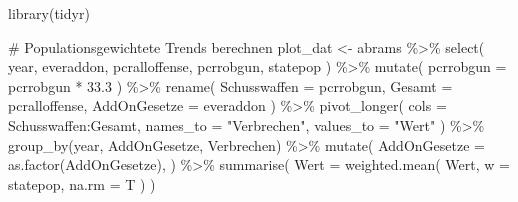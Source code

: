 \documentclass[
  a4paper,
  DIV=11,
  oneside]{scrreprt}
\newenvironment{Shaded}{\begin{snugshade}}{\end{snugshade}}
\newcommand{\AttributeTok}[1]{\textcolor[rgb]{0.40,0.45,0.13}{#1}}
\newcommand{\CommentTok}[1]{\textcolor[rgb]{0.37,0.37,0.37}{#1}}
\newcommand{\FloatTok}[1]{\textcolor[rgb]{0.68,0.00,0.00}{#1}}
\newcommand{\FunctionTok}[1]{\textcolor[rgb]{0.28,0.35,0.67}{#1}}
\newcommand{\NormalTok}[1]{\textcolor[rgb]{0.00,0.23,0.31}{#1}}
\newcommand{\OtherTok}[1]{\textcolor[rgb]{0.00,0.23,0.31}{#1}}
\newcommand{\SpecialCharTok}[1]{\textcolor[rgb]{0.37,0.37,0.37}{#1}}
\newcommand{\StringTok}[1]{\textcolor[rgb]{0.13,0.47,0.30}{#1}}
\begin{document}
\begin{Shaded}
\begin{Highlighting}[]
\FunctionTok{library}\NormalTok{(tidyr)}

\CommentTok{\# Populationsgewichtete Trends berechnen}
\NormalTok{plot\_dat }\OtherTok{\textless{}{-}}\NormalTok{ abrams }\SpecialCharTok{\%\textgreater{}\%} 
  \FunctionTok{select}\NormalTok{(}
\NormalTok{    year, }
\NormalTok{    everaddon, }
\NormalTok{    pcralloffense, }
\NormalTok{    pcrrobgun, }
\NormalTok{    statepop}
\NormalTok{  ) }\SpecialCharTok{\%\textgreater{}\%}
  \FunctionTok{mutate}\NormalTok{(}
    \AttributeTok{pcrrobgun =}\NormalTok{ pcrrobgun }\SpecialCharTok{*} \FloatTok{33.3}
\NormalTok{  ) }\SpecialCharTok{\%\textgreater{}\%}
  \FunctionTok{rename}\NormalTok{(}
    \AttributeTok{Schusswaffen =}\NormalTok{ pcrrobgun, }
    \AttributeTok{Gesamt =}\NormalTok{ pcralloffense,}
    \AttributeTok{AddOnGesetze =}\NormalTok{ everaddon}
\NormalTok{  ) }\SpecialCharTok{\%\textgreater{}\%}
  \FunctionTok{pivot\_longer}\NormalTok{(}
    \AttributeTok{cols =}\NormalTok{ Schusswaffen}\SpecialCharTok{:}\NormalTok{Gesamt, }
    \AttributeTok{names\_to =} \StringTok{"Verbrechen"}\NormalTok{, }
    \AttributeTok{values\_to =} \StringTok{"Wert"}
\NormalTok{  ) }\SpecialCharTok{\%\textgreater{}\%}
  \FunctionTok{group\_by}\NormalTok{(year, AddOnGesetze, Verbrechen) }\SpecialCharTok{\%\textgreater{}\%} 
  \FunctionTok{mutate}\NormalTok{(}
    \AttributeTok{AddOnGesetze =} \FunctionTok{as.factor}\NormalTok{(AddOnGesetze),}
\NormalTok{    ) }\SpecialCharTok{\%\textgreater{}\%}
  \FunctionTok{summarise}\NormalTok{(}
    \AttributeTok{Wert =} \FunctionTok{weighted.mean}\NormalTok{(}
\NormalTok{      Wert, }
      \AttributeTok{w =}\NormalTok{ statepop, }
      \AttributeTok{na.rm =}\NormalTok{ T}
\NormalTok{    )}
\NormalTok{  ) }
\end{Highlighting}
\end{Shaded}
\end{document}
